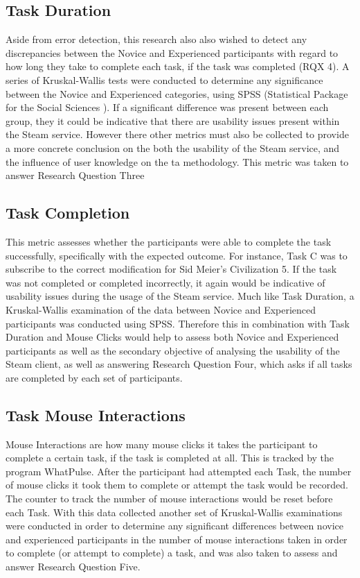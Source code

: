 \subsection{Task Duration}
Aside from error detection, this research also also wished to detect any discrepancies between the Novice and Experienced participants with regard to how long they take to complete each task, if the task was completed (RQX 4). A series of Kruskal-Wallis tests were conducted to determine any significance between the Novice and Experienced categories, using SPSS (Statistical Package for the Social Sciences \citep{SPSS2019}). If a significant difference was present between each group, they it could be indicative that there are usability issues present within the Steam service. However there other metrics must also be collected to provide a more concrete conclusion on the both the usability of the Steam service, and the influence of user knowledge on the \gls{ta} methodology. This metric was taken to answer Research Question Three

\subsection{Task Completion} 
This metric assesses whether the participants were able to complete the task successfully, specifically with the expected outcome. For instance, Task C was to subscribe to the correct modification for Sid Meier's Civilization 5. If the task was not completed or completed incorrectly, it again would be indicative of usability issues during the usage of the Steam service. Much like Task Duration, a Kruskal-Wallis examination of the data between Novice and Experienced participants was conducted using SPSS. Therefore this in combination with Task Duration and Mouse Clicks would help to assess both Novice and Experienced participants as well as the secondary objective of analysing the usability of the Steam client, as well as answering Research Question Four, which asks if all tasks are completed by each set of participants. 

\subsection{Task Mouse Interactions}
Mouse Interactions are how many mouse clicks it takes the participant to complete a certain task, if the task is completed at all. This is tracked by the program WhatPulse. After the participant had attempted each Task, the number of mouse clicks it took them to complete or attempt the task would be recorded. The counter to track the number of mouse interactions would be reset before each Task. With this data collected another set of Kruskal-Wallis examinations were conducted in order to determine any significant differences between novice and experienced participants in the number of mouse interactions taken in order to complete (or attempt to complete) a task, and was also taken to assess and answer Research Question Five. 

